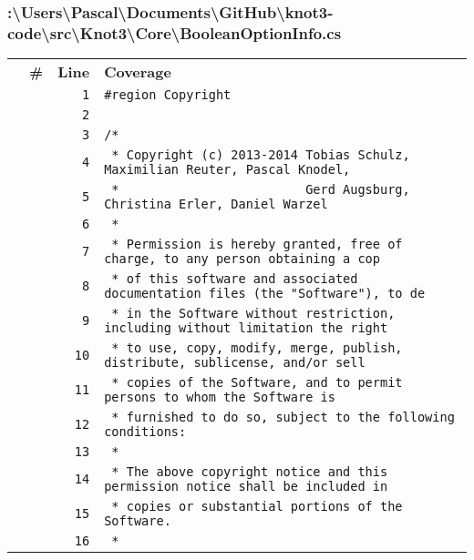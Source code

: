 \documentclass[a4paper,10pt]{article}
\begin{document}
\subsubsection{:\textbackslash Users\textbackslash Pascal\textbackslash Documents\textbackslash GitHub\textbackslash knot3-code\textbackslash src\textbackslash Knot3\textbackslash Core\textbackslash BooleanOptionInfo.cs}
\begin{longtable}[l]{lrrl}
\textbf{} & \textbf{\#} & \textbf{Line} & \textbf{Coverage}\\
\cellcolor{gray} &  & \verb~1~ & \verb~#region Copyright~\\
\cellcolor{gray} &  & \verb~2~ & \verb~~\\
\cellcolor{gray} &  & \verb~3~ & \verb~/*~\\
\cellcolor{gray} &  & \verb~4~ & \verb~ * Copyright (c) 2013-2014 Tobias Schulz, Maximilian Reuter, Pascal Knodel,~\\
\cellcolor{gray} &  & \verb~5~ & \verb~ *                         Gerd Augsburg, Christina Erler, Daniel Warzel~\\
\cellcolor{gray} &  & \verb~6~ & \verb~ *~\\
\cellcolor{gray} &  & \verb~7~ & \verb~ * Permission is hereby granted, free of charge, to any person obtaining a cop~\\
\cellcolor{gray} &  & \verb~8~ & \verb~ * of this software and associated documentation files (the "Software"), to de~\\
\cellcolor{gray} &  & \verb~9~ & \verb~ * in the Software without restriction, including without limitation the right~\\
\cellcolor{gray} &  & \verb~10~ & \verb~ * to use, copy, modify, merge, publish, distribute, sublicense, and/or sell~\\
\cellcolor{gray} &  & \verb~11~ & \verb~ * copies of the Software, and to permit persons to whom the Software is~\\
\cellcolor{gray} &  & \verb~12~ & \verb~ * furnished to do so, subject to the following conditions:~\\
\cellcolor{gray} &  & \verb~13~ & \verb~ *~\\
\cellcolor{gray} &  & \verb~14~ & \verb~ * The above copyright notice and this permission notice shall be included in ~\\
\cellcolor{gray} &  & \verb~15~ & \verb~ * copies or substantial portions of the Software.~\\
\cellcolor{gray} &  & \verb~16~ & \verb~ *~\\

\end{longtable}
\end{document}
